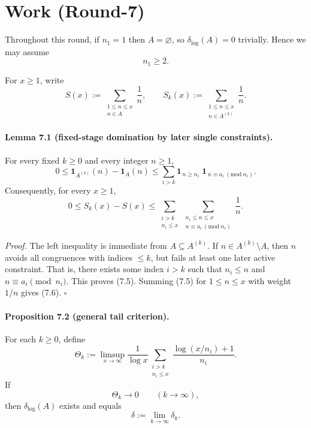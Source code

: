 \section{Work (Round-7)}
Throughout this round, if \(n_1=1\) then \(A=\varnothing\), so \(\delta_{\log}(A)=0\) trivially.  Hence we may assume
\begin{equation}
n_1\ge 2.
\tag{7.3}
\end{equation}

For \(x\ge 1\), write
\begin{equation}
S(x):=\sum_{\substack{1\le n\le x\\ n\in A}}\frac1n,
\qquad
S_k(x):=\sum_{\substack{1\le n\le x\\ n\in A^{(k)}}}\frac1n.
\tag{7.4}
\end{equation}

\paragraph{Lemma 7.1 (fixed-stage domination by later single constraints).}
For every fixed \(k\ge 0\) and every integer \(n\ge 1\),
\begin{equation}
0\le \mathbf 1_{A^{(k)}}(n)-\mathbf 1_A(n)
\le
\sum_{i>k}\mathbf 1_{\,n\ge n_i\,}\,\mathbf 1_{\,n\equiv a_i\ (\mathrm{mod}\ n_i)}.
\tag{7.5}
\end{equation}
Consequently, for every \(x\ge 1\),
\begin{equation}
0\le S_k(x)-S(x)
\le
\sum_{\substack{i>k\\ n_i\le x}}
\sum_{\substack{n_i\le n\le x\\ n\equiv a_i\ (\mathrm{mod}\ n_i)}}\frac1n.
\tag{7.6}
\end{equation}

\emph{Proof.}
The left inequality is immediate from \(A\subseteq A^{(k)}\).
If \(n\in A^{(k)}\setminus A\), then \(n\) avoids all congruences with indices \(\le k\), but fails at least one later active
constraint.  That is, there exists some index \(i>k\) such that \(n_i\le n\) and \(n\equiv a_i\pmod{n_i}\).
This proves (7.5).  Summing (7.5) for \(1\le n\le x\) with weight \(1/n\) gives (7.6).  \hfill
\(\square\)

\paragraph{Proposition 7.2 (general tail criterion).}
For each \(k\ge 0\), define
\begin{equation}
\Theta_k
:=
\limsup_{x\to\infty}
\frac1{\log x}
\sum_{\substack{i>k\\ n_i\le x}}
\frac{\log(x/n_i)+1}{n_i}.
\tag{7.7}
\end{equation}
If
\begin{equation}
\Theta_k\longrightarrow 0\qquad(k\to\infty),
\tag{7.8}
\end{equation}
then \(\delta_{\log}(A)\) exists and equals
\begin{equation}
\delta:=\lim_{k\to\infty}\delta_k.
\tag{7.9}
\end{equation}

